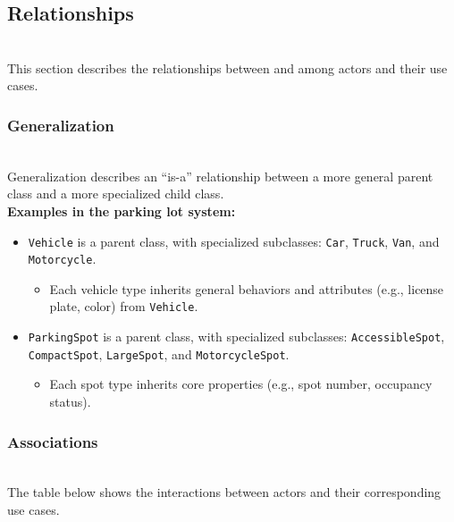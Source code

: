 \subsection{Relationships}\label{dRpL1k3qDRDKs5SaHC0ib}
\\
This section describes the relationships between and among actors and their use cases.

\subsubsection{Generalization}\label{-YH7gKhpvidxXvNYRiM1W}
\\
Generalization describes an ``is-a'' relationship between a more general parent class and a more specialized child class.
\\
\textbf{Examples in the parking lot system:}

\begin{itemize}
\item
\protect{}\label{FoZdyow7c-SSMf5OFeNsA}
\texttt{Vehicle} is a parent class, with specialized subclasses: \texttt{Car}, \texttt{Truck}, \texttt{Van}, and \texttt{Motorcycle}.

\begin{itemize}
\item
Each vehicle type inherits general behaviors and attributes (e.g., license plate, color) from \texttt{Vehicle}.
\end{itemize}
\item
\protect{}\label{gELCpd5yIQQdCZwEKHg67}
\texttt{ParkingSpot} is a parent class, with specialized subclasses: \texttt{AccessibleSpot}, \texttt{CompactSpot}, \texttt{LargeSpot}, and \texttt{MotorcycleSpot}.

\begin{itemize}
\item
Each spot type inherits core properties (e.g., spot number, occupancy status).
\end{itemize}
\end{itemize}

\subsubsection{Associations}\label{d8DaJvVuYmwXBRbJWVf4N}
\\
The table below shows the interactions between actors and their corresponding use cases.

